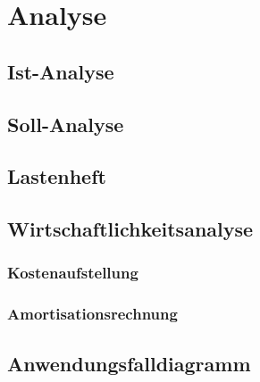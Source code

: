 \section{Analyse}
\subsection{Ist-Analyse}

\subsection{Soll-Analyse}

\subsection{Lastenheft}

\subsection{Wirtschaftlichkeitsanalyse}

\subsubsection{Kostenaufstellung}

\subsubsection{Amortisationsrechnung}

\subsection{Anwendungsfalldiagramm}
